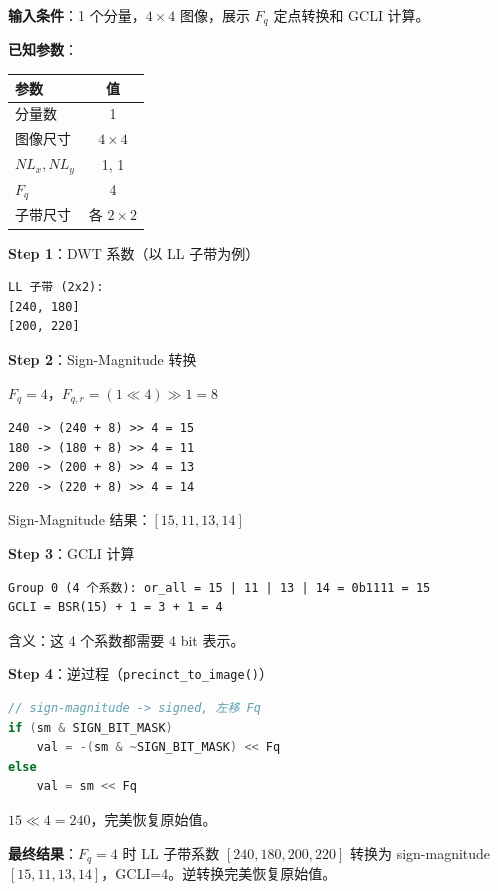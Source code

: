 \begin{examplebox}[title={例 3：Precinct 系数提取}]

\textbf{输入条件}：1 个分量，$4 \times 4$ 图像，展示 $F_q$ 定点转换和 GCLI 计算。

\medskip
\textbf{已知参数}：

\begin{tabular}{@{}lc@{}}
\toprule
参数 & 值 \\
\midrule
分量数 & 1 \\
图像尺寸 & $4 \times 4$ \\
$NL_x, NL_y$ & 1, 1 \\
$F_q$ & 4 \\
子带尺寸 & 各 $2 \times 2$ \\
\bottomrule
\end{tabular}

\medskip
\textbf{Step 1}：DWT 系数（以 LL 子带为例）

\begin{lstlisting}[numbers=none]
LL 子带 (2x2):
[240, 180]
[200, 220]
\end{lstlisting}

\textbf{Step 2}：Sign-Magnitude 转换

$F_q = 4$，$F_{q,r} = (1 \ll 4) \gg 1 = 8$

\begin{lstlisting}[numbers=none]
240 -> (240 + 8) >> 4 = 15
180 -> (180 + 8) >> 4 = 11
200 -> (200 + 8) >> 4 = 13
220 -> (220 + 8) >> 4 = 14
\end{lstlisting}

Sign-Magnitude 结果：$[15, 11, 13, 14]$

\textbf{Step 3}：GCLI 计算

\begin{lstlisting}[numbers=none]
Group 0 (4 个系数): or_all = 15 | 11 | 13 | 14 = 0b1111 = 15
GCLI = BSR(15) + 1 = 3 + 1 = 4
\end{lstlisting}

含义：这 4 个系数都需要 4 bit 表示。

\textbf{Step 4}：逆过程（\texttt{precinct\_to\_image()}）

\begin{lstlisting}[language=C,numbers=none]
// sign-magnitude -> signed, 左移 Fq
if (sm & SIGN_BIT_MASK)
    val = -(sm & ~SIGN_BIT_MASK) << Fq
else
    val = sm << Fq
\end{lstlisting}

$15 \ll 4 = 240$，完美恢复原始值。

\medskip
\textbf{最终结果}：$F_q=4$ 时 LL 子带系数 $[240, 180, 200, 220]$ 转换为 sign-magnitude $[15, 11, 13, 14]$，GCLI=4。逆转换完美恢复原始值。
\end{examplebox}
